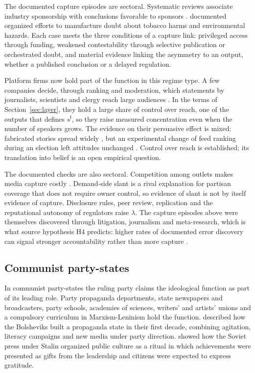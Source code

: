 \documentclass[11pt,letterpaper]{article}
\theoremstyle{definition}
\theoremstyle{remark}
\newcommand{\pI}{\mathsf{I}}
\begin{document}
The documented capture episodes are sectoral. Systematic reviews associate industry sponsorship with conclusions favorable to sponsors \citep{bekelman2003,lexchin2003,lundh2017}. \citet{oreskes2010} documented organized efforts to manufacture doubt about tobacco harms and environmental hazards. Each case meets the three conditions of a capture link: privileged access through funding, weakened contestability through selective publication or orchestrated doubt, and material evidence linking the asymmetry to an output, whether a published conclusion or a delayed regulation.

Platform firms now hold part of the function in this regime type. A few companies decide, through ranking and moderation, which statements by journalists, scientists and clergy reach large audiences \citep{gillespie2019}. In the terms of Section~\ref{sec:layer}, they hold a large share of control over reach, one of the outputs that defines $s^{\pI}$, so they raise measured concentration even when the number of speakers grows. The evidence on their persuasive effect is mixed: fabricated stories spread widely \citep{allcott2017}, but an experimental change of feed ranking during an election left attitudes unchanged \citep{guess2023}. Control over reach is established; its translation into belief is an open empirical question.

The documented checks are also sectoral. Competition among outlets makes media capture costly \citep{besley2006}. Demand-side slant \citep{gentzkow2006} is a rival explanation for partisan coverage that does not require owner control, so evidence of slant is not by itself evidence of capture. Disclosure rules, peer review, replication and the reputational autonomy of regulators \citep{carpenter2010} raise $\lambda$. The capture episodes above were themselves discovered through litigation, journalism and meta-research, which is what source hypothesis H4 predicts: higher rates of documented error discovery can signal stronger accountability rather than more capture \citep{largo2026hbs}.

\subsection{Communist party-states}

In communist party-states the ruling party claims the ideological function as part of its leading role. Party propaganda departments, state newspapers and broadcasters, party schools, academies of sciences, writers' and artists' unions and a compulsory curriculum in Marxism-Leninism hold the function. \citet{kenez1985} described how the Bolsheviks built a propaganda state in their first decade, combining agitation, literacy campaigns and new media under party direction. \citet{brooks2000} showed how the Soviet press under Stalin organized public culture as a ritual in which achievements were presented as gifts from the leadership and citizens were expected to express gratitude.
\end{document}
